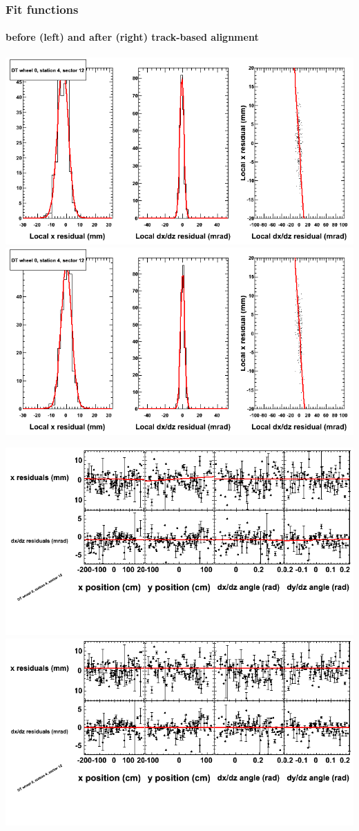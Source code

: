\documentclass[compress]{beamer}
\begin{document}
\begin{frame}
\frametitle{Fit functions}
\framesubtitle{before (left) and after (right) track-based alignment}
\includegraphics[width=0.5\linewidth]{fitfunctions_re01/MBwhCst4sec12_bellcurves.png} \includegraphics[width=0.5\linewidth]{fitfunctions_re05/MBwhCst4sec12_bellcurves.png}

\includegraphics[width=0.5\linewidth]{fitfunctions_re01/MBwhCst4sec12_polynomials.png} \includegraphics[width=0.5\linewidth]{fitfunctions_re05/MBwhCst4sec12_polynomials.png}
\end{frame}
\end{document}
